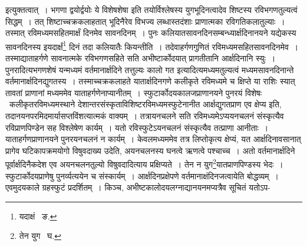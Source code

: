 \documentclass[11pt, openany]{book}
\begin{document}
\newpage

 इत्युक्तत्वात्~। भगणा द्वयोर्द्वयोः ये विशेषशेषा इति तयोर्विश्लेषस्य युगभूदिनत्वादेव शिष्टस्य रविभगणतुल्यत्वं सिद्धम्~। तत् शिष्टाच्चक्रकलाहतात् भूदिनैरेव विभज्य लब्धास्तदंशाः प्राणात्मका रविगतिकलातुल्याः~। तस्मात् रविमध्यमसहितमार्क्षं दिनमेव 
सावनदिनम्~। पुनः कलियातसावनदिनसम्बन्ध्यार्क्षदिनानयने यद्येकस्य सावनदिनस्य इयदार्क्षं\renewcommand{\thefootnote}{१}\footnote{यदाक्षं \textendash\ ङ.} दिनं तदा कलियातैः कियन्तीति~। तदेवाहर्गणगुणितं रविमध्यमसहितसावनदिनमेव~। तस्माद्याताहर्गणे सावनात्मके रविभगणसहिते सति अभीष्टार्कोदयात् प्रागतीतानि आर्क्षदिनानि स्युः~। पुनरादित्यभगणशेषं यन्मध्यमं वर्तमानार्क्षदिने तत्तुल्यः कालो गत इत्यादित्यमध्यमतुल्यत्वं मध्यमसावनदिनान्ते वर्तमानार्क्षदिनद्युगतस्य~।
तस्माच्चक्रकलाहते यातार्क्षदिनगणे कलीकृते रविमध्यमे च क्षिप्ते या राशिः स्यात् तावतां प्राणानां मध्यममेव याताहर्गणेनाप्यानीतम्~। स्फुटार्कोदयकालजप्राणानयने पुनरयं विशेषः \textendash\ कलीकृतरविमध्यमस्थाने देशान्तरसंस्कृताविशिष्टरविमध्यमस्फुटेनानीत आर्क्षद्युगतप्राण एव क्षेप्य इति, तदानयनपरमिदमार्यासप्तविंशत्यात्मकं वाक्यम्~। तत्रायनचलने सति रविमध्यमेऽप्ययनचलनं संस्कृत्यैव रविप्राणपिण्डेन सह विश्लेषेण कार्यम्~। यतो रविस्फुटेऽयनचलनं संस्कृत्यैव तत्प्राणा आनीताः~। याताहर्गणप्राणानयने पुनरयनचलनं न कार्यम्~। केवलमध्यममेव तत्र लिप्तोकृत्य क्षेप्यं, यत आर्क्षदिनावसानात् प्रागेव घटिकापक्रमयोगो विषुवदाख्य उदेति, अयनचलनस्य घनत्वे ऋणत्वे पश्चाच्च~। अतो वर्तमानार्क्षदिने पूर्वार्क्षदिनैकदेश एव अयनचलनतुल्यो विषुवदादित्याय प्रक्षिप्यते~। तेन न युग\renewcommand{\thefootnote}{२}\footnote{तेन युग \textendash\ घ.}यातप्राणपिण्डस्य भेदः~। स्फुटार्कोदयप्राणेषु पुनर्व्यत्ययेन च संस्कार्यम्~। आर्क्षदिनप्रक्षेपणे वर्तमानाक्षंदिनजत्वायेति बोद्धव्यम्~। एवमुदयकाले ग्रहस्फुटं प्रदर्शितम्~। किञ्च, अभीष्टकालोदयलग्नाद्यानयनमप्यत्रैव सूचितं यतोऽप- 
\end{document}
